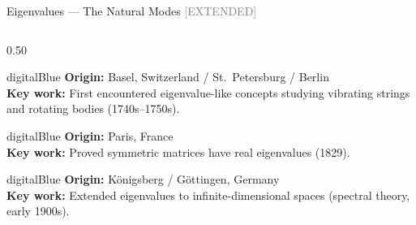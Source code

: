 \begin{frame}[shrink=25]{Eigenvalues --- The Natural Modes \hfill {\small\textcolor{gray}{[EXTENDED]}}}

  \begin{columns}[T]
    \begin{column}{0.50\textwidth}
      \begin{personbox}{digitalBlue}
        \small
        \textbf{Origin:} Basel, Switzerland / St.\ Petersburg / Berlin\\
        \textbf{Key work:} First encountered eigenvalue-like concepts studying
        vibrating strings and rotating bodies (1740s--1750s).
      \end{personbox}

      \vspace{0.2em}
      \begin{personbox}{digitalBlue}
        \small
        \textbf{Origin:} Paris, France\\
        \textbf{Key work:} Proved symmetric matrices have real eigenvalues (1829).
      \end{personbox}

      \vspace{0.2em}
      \begin{personbox}{digitalBlue}
        \small
        \textbf{Origin:} K\"onigsberg / G\"ottingen, Germany\\
        \textbf{Key work:} Extended eigenvalues to infinite-dimensional spaces (spectral theory, early 1900s).
      \end{personbox}
    \end{column}


\end{columns}
\end{frame}
